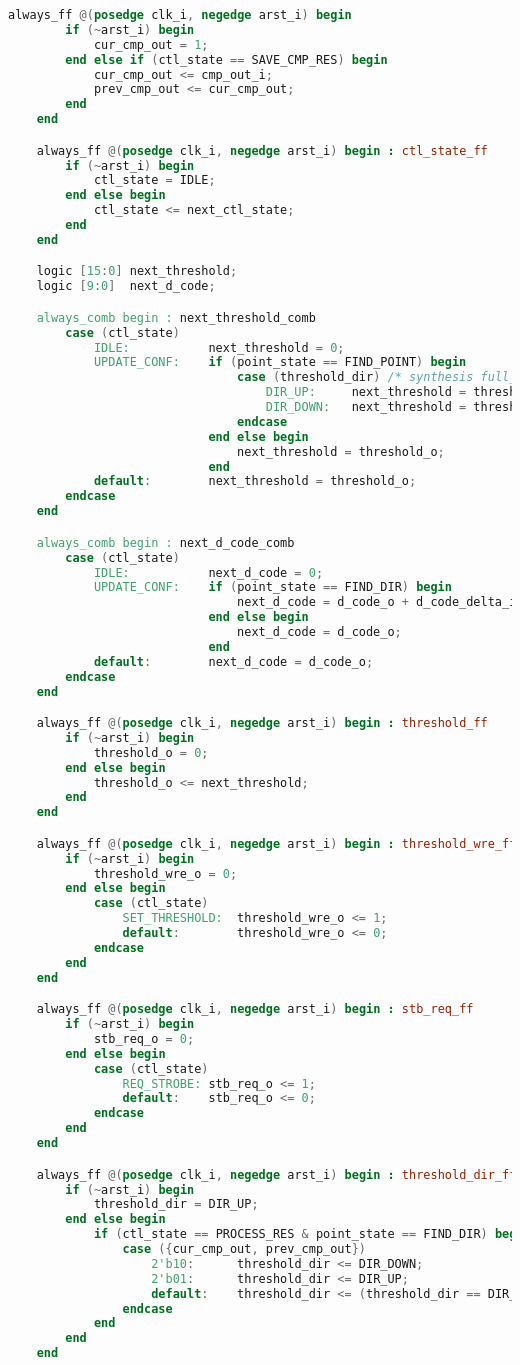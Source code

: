\begin{lstlisting}[language=Verilog]
	always_ff @(posedge clk_i, negedge arst_i) begin
		if (~arst_i) begin
			cur_cmp_out = 1;
		end else if (ctl_state == SAVE_CMP_RES) begin
			cur_cmp_out <= cmp_out_i;
			prev_cmp_out <= cur_cmp_out;
		end
	end

	always_ff @(posedge clk_i, negedge arst_i) begin : ctl_state_ff
		if (~arst_i) begin
			ctl_state = IDLE;
		end else begin
			ctl_state <= next_ctl_state;
		end
	end

	logic [15:0] next_threshold;
	logic [9:0]	 next_d_code;

	always_comb begin : next_threshold_comb
		case (ctl_state)
			IDLE:			next_threshold = 0;
			UPDATE_CONF:	if (point_state == FIND_POINT) begin
								case (threshold_dir) /* synthesis full_case */
									DIR_UP: 	next_threshold = threshold_o + threshold_delta_i;
									DIR_DOWN:	next_threshold = threshold_o - threshold_delta_i;	
								endcase
							end else begin
								next_threshold = threshold_o;
							end
			default:		next_threshold = threshold_o;
		endcase
	end

	always_comb begin : next_d_code_comb
		case (ctl_state)
			IDLE:			next_d_code = 0;
			UPDATE_CONF:	if (point_state == FIND_DIR) begin
				   				next_d_code = d_code_o + d_code_delta_i;
							end else begin
								next_d_code = d_code_o;
							end
			default:		next_d_code = d_code_o;
		endcase
	end

	always_ff @(posedge clk_i, negedge arst_i) begin : threshold_ff
		if (~arst_i) begin
			threshold_o = 0;
		end else begin
			threshold_o <= next_threshold;
		end
	end

	always_ff @(posedge clk_i, negedge arst_i) begin : threshold_wre_ff
		if (~arst_i) begin
			threshold_wre_o = 0;
		end else begin
			case (ctl_state)
				SET_THRESHOLD:  threshold_wre_o <= 1;
				default:        threshold_wre_o <= 0; 
			endcase
		end
	end

	always_ff @(posedge clk_i, negedge arst_i) begin : stb_req_ff
		if (~arst_i) begin
			stb_req_o = 0;
		end else begin
			case (ctl_state)
				REQ_STROBE: stb_req_o <= 1;
				default:	stb_req_o <= 0;
			endcase
		end
	end

	always_ff @(posedge clk_i, negedge arst_i) begin : threshold_dir_ff
		if (~arst_i) begin
			threshold_dir = DIR_UP;
		end else begin
			if (ctl_state == PROCESS_RES & point_state == FIND_DIR) begin
				case ({cur_cmp_out, prev_cmp_out})
					2'b10:		threshold_dir <= DIR_DOWN;	
					2'b01:		threshold_dir <= DIR_UP;	
					default: 	threshold_dir <= (threshold_dir == DIR_DOWN ? DIR_UP : DIR_DOWN);
				endcase
			end
		end
	end


\end{lstlisting}
